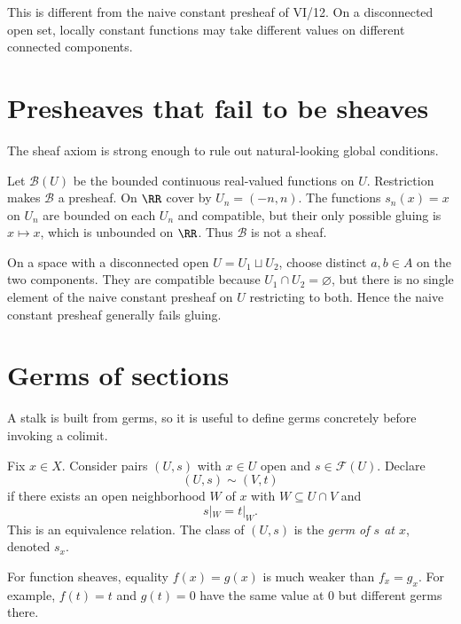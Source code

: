 

This is different from the naive constant presheaf of VI/12.  On a disconnected open set,
locally constant functions may take different values on different connected components.

\section{Presheaves that fail to be sheaves}

The sheaf axiom is strong enough to rule out natural-looking global conditions.

\begin{example}
Let $\mathcal B(U)$ be the bounded continuous real-valued functions on $U$.  Restriction
makes $\mathcal B$ a presheaf.  On $\RR$ cover by $U_n=(-n,n)$.  The functions
$s_n(x)=x$ on $U_n$ are bounded on each $U_n$ and compatible, but their only possible
gluing is $x\mapsto x$, which is unbounded on $\RR$.  Thus $\mathcal B$ is not a sheaf.
\end{example}

\begin{example}
On a space with a disconnected open $U=U_1\sqcup U_2$, choose distinct $a,b\in A$ on the
two components.  They are compatible because $U_1\cap U_2=\varnothing$, but there is no
single element of the naive constant presheaf on $U$ restricting to both.  Hence the naive
constant presheaf generally fails gluing.
\end{example}

\section{Germs of sections}

A stalk is built from germs, so it is useful to define germs concretely before invoking a
colimit.

Fix $x\in X$.  Consider pairs $(U,s)$ with $x\in U$ open and $s\in\mathcal F(U)$.  Declare
\[
(U,s)\sim(V,t)
\]
if there exists an open neighborhood $W$ of $x$ with $W\subseteq U\cap V$ and
\[
s|_W=t|_W.
\]
This is an equivalence relation.  The class of $(U,s)$ is the \emph{germ of $s$ at $x$},
denoted $s_x$.



\begin{warning}
For function sheaves, equality $f(x)=g(x)$ is much weaker than $f_x=g_x$.  For example,
$f(t)=t$ and $g(t)=0$ have the same value at $0$ but different germs there.
\end{warning}

